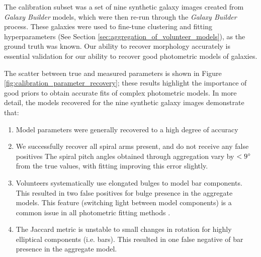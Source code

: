 \documentclass[trackchanges]{aastex63}
\begin{document}
The calibration subset was a set of nine synthetic galaxy images created from \textit{Galaxy Builder} models, which were then re-run through the \textit{Galaxy Builder} process. These galaxies were used to fine-tune clustering and fitting hyperparameters (See Section \ref{sec:aggregation_of_volunteer_models}), as the ground truth was known. Our ability to recover morphology accurately is essential validation for our ability to recover good photometric models of galaxies.

The scatter between true and measured parameters is shown in Figure \ref{fig:calibration_parameter_recovery}; these results highlight the importance of good priors to obtain accurate fits of complex photometric models. In more detail, the models recovered for the nine synthetic galaxy images demonstrate that:

\begin{enumerate}
  \item Model parameters were generally recovered to a high degree of accuracy
  \item We successfully recover all spiral arms present, and do not receive any false positives
The spiral pitch angles obtained through aggregation vary by $< 9\degree$ from the true values, with fitting improving this error slightly.
  \item Volunteers systematically use elongated bulges to model bar components. This resulted in two false positives for bulge presence in the aggregate models. This feature (switching light between model components) is a common issue in all photometric fitting methods \citep{2018MNRAS.473.4731K}.
  \item The Jaccard metric is unstable to small changes in rotation for highly elliptical components (i.e. bars). This resulted in one false negative of bar presence in the aggregate model.
\end{enumerate}

\begin{figure*}
  \caption{Plots examining the accuracy of fit parameters for the calibration subset of galaxies. Most parameters are recovered to a high degree of accuracy, however S\'ersic index and boxiness are difficult to determine only using gradient descent, as they do not significantly impact the goodness of fit \citep{2012MNRAS.421.2277L}. The error in the fit values reflects this problem.}
  \label{fig:calibration_parameter_recovery}
\end{figure*}
\end{document}
